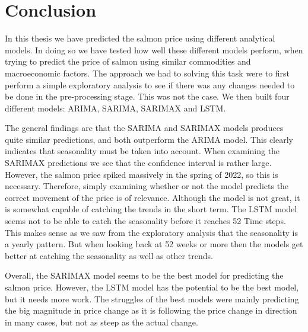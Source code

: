 \section{Conclusion}
In this thesis we have predicted the salmon price using different analytical models. In doing so we have tested how well these different models perform, when trying to predict the price of salmon using similar commodities and macroeconomic factors. The approach we had to solving this task were to first perform a simple exploratory analysis to see if there was any changes needed to be done in the pre-processing stage. This was not the case. We then built four different models: ARIMA, SARIMA, SARIMAX and LSTM.

The general findings are that the SARIMA and SARIMAX models produces quite similar predictions, and both outperform the ARIMA model. This clearly indicates that seasonality must be taken into account. When examining the SARIMAX predictions we see that the confidence interval is rather large. However, the salmon price spiked massively in the spring of 2022, so this is necessary. Therefore, simply examining whether or not the model predicts the correct movement of the price is of relevance. Although the model is not great, it is somewhat capable of catching the trends in the short term. The LSTM model seems not to be able to catch the seasonality before it reaches 52 Time steps. This makes sense as we saw from the exploratory analysis that the seasonality is a yearly pattern. But when looking back at 52 weeks or more then the models get better at catching the seasonality as well as other trends.

Overall, the SARIMAX model seems to be the best model for predicting the salmon price. However, the LSTM model has the potential to be the best model, but it needs more work. The struggles of the best models were mainly predicting the big magnitude in price change as it is following the price change in direction in many cases, but not as steep as the actual change.
